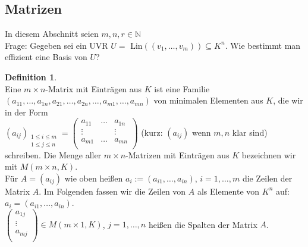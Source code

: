 \documentclass[10pt,a4paper,numbers=endperiod]{scrartcl}
\theoremstyle{definition}
\newtheorem{defi}[satz]{Definition}
\begin{document}
\subsection{Matrizen}
In diesem Abschnitt seien $m,n,r \in \mathbb{N}$\\
Frage: Gegeben sei ein UVR $U=\text{ Lin}((v_1,\ldots,v_m)) \subseteq K^n$. Wie bestimmt man effizient eine Basis von $U$?
\begin{defi}
	$ $\\
	Eine $m \times n$-Matrix mit Einträgen aus $K$ ist eine Familie $(a_{11},\ldots,a_{1n},a_{21},\ldots,a_{2n},\ldots,a_{m1},\ldots,a_{mn})$ von minimalen Elementen aus $K$, die wir in der Form\\
	$(a_{ij})_{\substack{1 \leq i \leq m\\ 1\leq j \leq n}} = \begin{pmatrix}
	a_{11} & \dots & a_{1n}\\
	\vdots & &\vdots\\
	a_{m1}& \dots & a_{mn}\\
	\end{pmatrix}$ (kurz: $(a_{ij})$ wenn $m,n$ klar sind) schreiben. Die Menge aller $m \times n$-Matrizen mit Einträgen aus $K$ bezeichnen wir mit $M(m \times n,K)$.\\
	Für $A=(a_{ij})$ wie oben heißen $a_i:=(a_{i1},\ldots,a_{in})$, $i=1,\ldots,m$ die Zeilen der Matrix $A$. Im Folgenden fassen wir die Zeilen von $A$ als Elemente von $K^n$ auf: $a_i=(a_{i1},\ldots,a_{in})$.\\
	$\begin{pmatrix}
	a_{1j}\\
	\vdots\\
	a_{mj}\\
	\end{pmatrix} \in M(m \times 1,K)$, $j=1,\ldots,n$ heißen die Spalten der Matrix $A$.
\end{defi}
\end{document}
